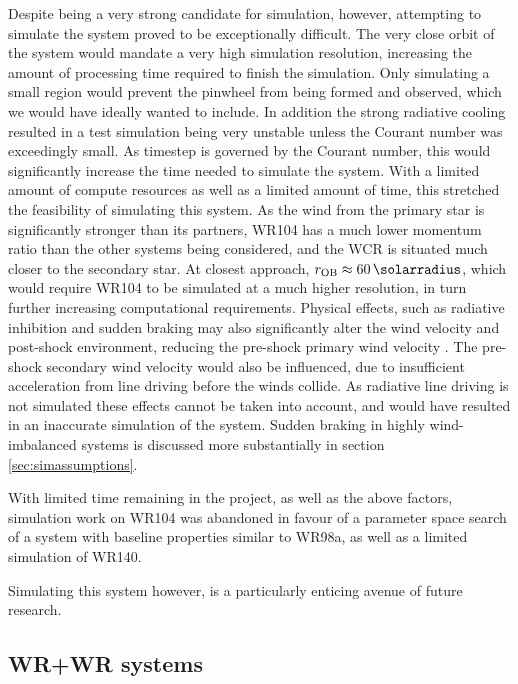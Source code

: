 Despite being a very strong candidate for simulation, however, attempting to simulate the system proved to be exceptionally difficult.
The very close orbit of the system would mandate a very high simulation resolution, increasing the amount of processing time required to finish the simulation.
Only simulating a small region would prevent the pinwheel from being formed and observed, which we would have ideally wanted to include.
In addition the strong radiative cooling resulted in a test simulation being very unstable unless the Courant number was exceedingly small.
As timestep is governed by the Courant number, this would significantly increase the time needed to simulate the system.
With a limited amount of compute resources as well as a limited amount of time, this stretched the feasibility of simulating this system.
As the wind from the primary star is significantly stronger than its partners, WR104 has a much lower momentum ratio than the other systems being considered, and the WCR is situated much closer to the secondary star.
At closest approach, $r_\text{OB} \approx \SI{60}{\solarradius}$, which would require WR104 to be simulated at a much higher resolution, in turn further increasing computational requirements.
Physical effects, such as radiative inhibition and sudden braking may also significantly alter the wind velocity and post-shock environment, reducing the pre-shock primary wind velocity \parencite{gayley_sudden_1997}.
The pre-shock secondary wind velocity would also be influenced, due to insufficient acceleration from line driving before the winds collide.
As radiative line driving is not simulated these effects cannot be taken into account, and would have resulted in an inaccurate simulation of the system.
Sudden braking in highly wind-imbalanced systems is discussed more substantially in section \ref{sec:simassumptions}.

With limited time remaining in the project, as well as the above factors, simulation work on WR104 was abandoned in favour of a parameter space search of a system with baseline properties similar to WR98a, as well as a limited simulation of WR140.

Simulating this system however, is a particularly enticing avenue of future research.

\subsection{WR+WR systems}

